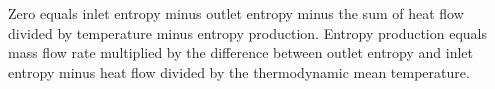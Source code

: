 Zero equals inlet entropy minus outlet entropy minus the sum of heat flow divided by temperature minus entropy production.  
Entropy production equals mass flow rate multiplied by the difference between outlet entropy and inlet entropy minus heat flow divided by the thermodynamic mean temperature.